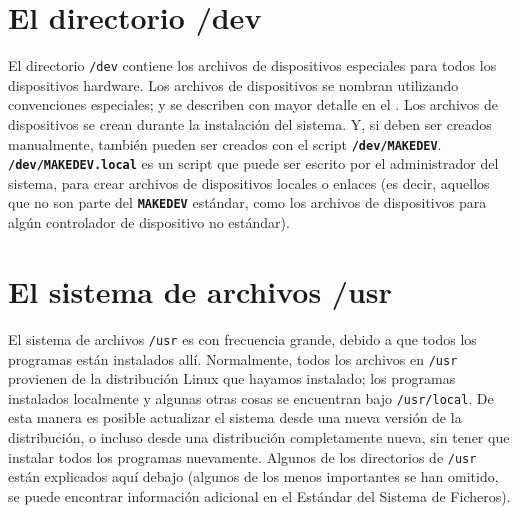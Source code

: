 \documentclass[12pt]{article}
\begin{document}
\section{ El directorio /dev}

El directorio \texttt{/dev} contiene los archivos de
dispositivos especiales para todos los dispositivos hardware. Los archivos de
dispositivos se nombran utilizando convenciones especiales; y se describen
con mayor detalle 
en el 
. Los archivos de dispositivos se crean durante
la instalación del sistema. Y, si deben ser creados manualmente, también pueden ser creados con el script
\texttt{\textbf{/dev/MAKEDEV}}. \texttt{\textbf{/dev/MAKEDEV.local}} es un
script que puede ser escrito por el administrador del sistema, para crear archivos de
dispositivos locales o enlaces (es decir, aquellos que no son parte del
\texttt{\textbf{MAKEDEV}} estándar, como los archivos de dispositivos para algún
controlador de dispositivo no estándar).  




\section{ El sistema de archivos /usr}

El sistema de archivos \texttt{/usr} es con frecuencia grande,
debido a que todos los programas están instalados allí. Normalmente, todos los
archivos en \texttt{/usr} provienen de la distribución Linux que
hayamos instalado; los programas instalados localmente y algunas otras cosas
se encuentran bajo \texttt{/usr/local}. De esta manera es posible
actualizar el sistema desde una nueva versión de la distribución, o incluso
desde una distribución completamente nueva, sin tener que instalar todos los
programas nuevamente. Algunos de los directorios de \texttt{/usr}
están explicados aquí debajo (algunos de los menos importantes se han omitido,
se puede encontrar información adicional en el Estándar del Sistema de
Ficheros).  
\end{document}
